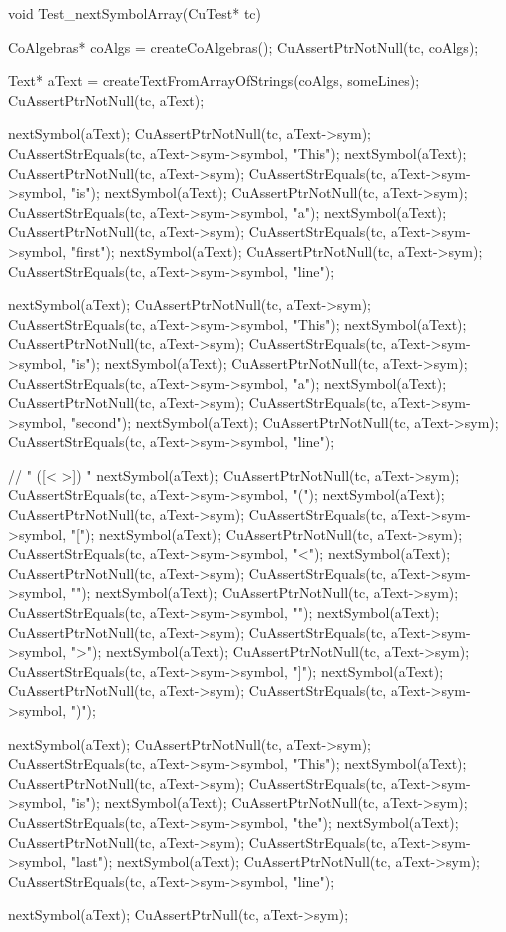 void Test_nextSymbolArray(CuTest* tc) {
  CoAlgebras* coAlgs = createCoAlgebras();
  CuAssertPtrNotNull(tc, coAlgs);

  Text* aText = createTextFromArrayOfStrings(coAlgs, someLines);
  CuAssertPtrNotNull(tc, aText);

  nextSymbol(aText);
  CuAssertPtrNotNull(tc, aText->sym);
  CuAssertStrEquals(tc, aText->sym->symbol, "This");
  nextSymbol(aText);
  CuAssertPtrNotNull(tc, aText->sym);
  CuAssertStrEquals(tc, aText->sym->symbol, "is");
  nextSymbol(aText);
  CuAssertPtrNotNull(tc, aText->sym);
  CuAssertStrEquals(tc, aText->sym->symbol, "a");
  nextSymbol(aText);
  CuAssertPtrNotNull(tc, aText->sym);
  CuAssertStrEquals(tc, aText->sym->symbol, "first");
  nextSymbol(aText);
  CuAssertPtrNotNull(tc, aText->sym);
  CuAssertStrEquals(tc, aText->sym->symbol, "line");

  nextSymbol(aText);
  CuAssertPtrNotNull(tc, aText->sym);
  CuAssertStrEquals(tc, aText->sym->symbol, "This");
  nextSymbol(aText);
  CuAssertPtrNotNull(tc, aText->sym);
  CuAssertStrEquals(tc, aText->sym->symbol, "is");
  nextSymbol(aText);
  CuAssertPtrNotNull(tc, aText->sym);
  CuAssertStrEquals(tc, aText->sym->symbol, "a");
  nextSymbol(aText);
  CuAssertPtrNotNull(tc, aText->sym);
  CuAssertStrEquals(tc, aText->sym->symbol, "second");
  nextSymbol(aText);
  CuAssertPtrNotNull(tc, aText->sym);
  CuAssertStrEquals(tc, aText->sym->symbol, "line");

  // " ([<{ }>]) "
  nextSymbol(aText);
  CuAssertPtrNotNull(tc, aText->sym);
  CuAssertStrEquals(tc, aText->sym->symbol, "(");
  nextSymbol(aText);
  CuAssertPtrNotNull(tc, aText->sym);
  CuAssertStrEquals(tc, aText->sym->symbol, "[");
  nextSymbol(aText);
  CuAssertPtrNotNull(tc, aText->sym);
  CuAssertStrEquals(tc, aText->sym->symbol, "<");
  nextSymbol(aText);
  CuAssertPtrNotNull(tc, aText->sym);
  CuAssertStrEquals(tc, aText->sym->symbol, "{");
  nextSymbol(aText);
  CuAssertPtrNotNull(tc, aText->sym);
  CuAssertStrEquals(tc, aText->sym->symbol, "}");
  nextSymbol(aText);
  CuAssertPtrNotNull(tc, aText->sym);
  CuAssertStrEquals(tc, aText->sym->symbol, ">");
  nextSymbol(aText);
  CuAssertPtrNotNull(tc, aText->sym);
  CuAssertStrEquals(tc, aText->sym->symbol, "]");
  nextSymbol(aText);
  CuAssertPtrNotNull(tc, aText->sym);
  CuAssertStrEquals(tc, aText->sym->symbol, ")");

  nextSymbol(aText);
  CuAssertPtrNotNull(tc, aText->sym);
  CuAssertStrEquals(tc, aText->sym->symbol, "This");
  nextSymbol(aText);
  CuAssertPtrNotNull(tc, aText->sym);
  CuAssertStrEquals(tc, aText->sym->symbol, "is");
  nextSymbol(aText);
  CuAssertPtrNotNull(tc, aText->sym);
  CuAssertStrEquals(tc, aText->sym->symbol, "the");
  nextSymbol(aText);
  CuAssertPtrNotNull(tc, aText->sym);
  CuAssertStrEquals(tc, aText->sym->symbol, "last");
  nextSymbol(aText);
  CuAssertPtrNotNull(tc, aText->sym);
  CuAssertStrEquals(tc, aText->sym->symbol, "line");

  nextSymbol(aText);
  CuAssertPtrNull(tc, aText->sym);
}

